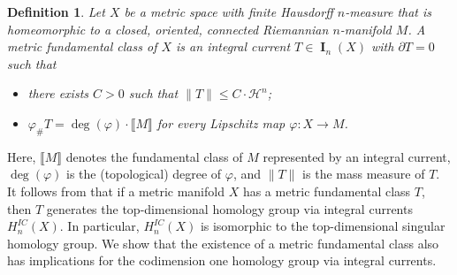 \documentclass{amsart}
\newtheorem{definition}[theorem]{Definition}
\numberwithin{equation}{section}
\newcommand{\Ha}{\mathcal{H}}
\DeclareMathOperator{\bI}{\mathbf{I}}
\newcommand{\bb}[1]{\llbracket #1\rrbracket}
\newcommand{\norm}[1]{\lVert#1\rVert}
\begin{document}
    \begin{definition}\label{def: metric fundamental class}
        Let $X$ be a metric space with finite Hausdorff $n$-measure that is homeomorphic to a closed, oriented, connected Riemannian $n$-manifold $M$. A metric fundamental class of $X$ is an integral current $T\in \bI_n(X)$ with $\partial T=0$ such that
        \begin{itemize}
            \item[(a)] there exists $C>0$ such that $\norm{T}\leq C \cdot \Ha^n$;
            \item[(b)] $\varphi_\# T = \deg(\varphi) \cdot \bb{M}$ for every Lipschitz map $\varphi \colon X \to M$.
        \end{itemize}
    \end{definition}

    Here, $\bb{M}$ denotes the fundamental class of $M$ represented by an integral current, $\deg(\varphi)$ is the (topological) degree of $\varphi$, and $\norm{T}$ is the mass measure of $T$. It follows from \cite[Proposition 5.5]{basso2023geometric} that if a metric manifold $X$ has a metric fundamental class $T$, then $T$ generates the top-dimensional homology group via integral currents $H_{n}^{IC}(X)$. In particular, $H_{n}^{IC}(X)$ is isomorphic to the top-dimensional singular homology group. We show that the existence of a metric fundamental class also has implications for the codimension one homology group via integral currents.
    
\end{document}
